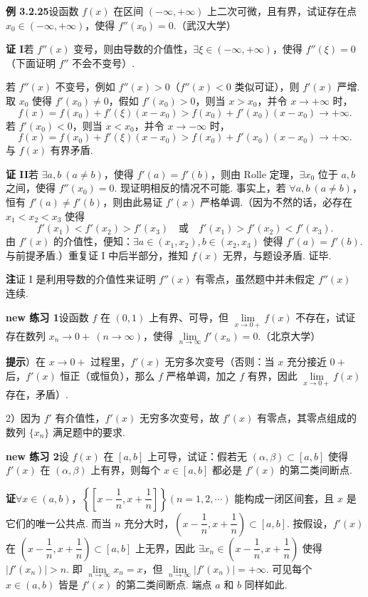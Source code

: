 \documentclass[UTF8,12pt,a4paper,fontset=fandol]{ctexart}
\begin{document}
\noindent\textbf{例 3.2.25}\quad 设函数 $f(x)$ 在区间 $(-\infty,+\infty)$ 上二次可微，且有界，试证存在点 $x_0\in(-\infty,+\infty)$，使得 $f''(x_0)=0$.（武汉大学）

\noindent\textbf{证 I}\quad 若 $f''(x)$ 变号，则由导数的介值性，$\exists\xi\in(-\infty,+\infty)$，使得 $f''(\xi)=0$（下面证明 $f''$ 不会不变号）.

若 $f''(x)$ 不变号，例如 $f''(x)>0$（$f''(x)<0$ 类似可证），则 $f'(x)$ 严增. 取 $x_0$ 使得 $f'(x_0)\ne0$，假如 $f'(x_0)>0$，则当 $x>x_0$，并令 $x\to+\infty$ 时，
\[
  f(x)=f(x_0)+f'(\xi)(x-x_0)>f(x_0)+f'(x_0)(x-x_0)\to+\infty.
\]
若 $f'(x_0)<0$，则当 $x<x_0$，并令 $x\to-\infty$ 时，
\[
  f(x)=f(x_0)+f'(\xi)(x-x_0)>f(x_0)+f'(x_0)(x-x_0)\to+\infty.
\]
与 $f(x)$ 有界矛盾.

\noindent\textbf{证 II}\quad 若 $\exists a,b\ (a\ne b)$，使得 $f'(a)=f'(b)$，则由 Rolle 定理，$\exists x_0$ 位于 $a,b$ 之间，使得 $f''(x_0)=0$. 现证明相反的情况不可能. 事实上，若 $\forall a,b\ (a\ne b)$，恒有 $f'(a)\ne f'(b)$，则由此易证 $f'(x)$ 严格单调.（因为不然的话，必存在 $x_1<x_2<x_3$ 使得
\[
  f'(x_1)<f'(x_2)>f'(x_3)\quad\text{或}\quad f'(x_1)>f'(x_2)<f'(x_3).
\]
由 $f'(x)$ 的介值性，便知：$\exists a\in(x_1,x_2),b\in(x_2,x_3)$ 使得 $f'(a)=f'(b)$. 与前提矛盾.）重复证 I 中后半部分，推知 $f(x)$ 无界，与题设矛盾. 证毕.

\noindent\textbf{注}\quad 证 I 是利用导数的介值性来证明 $f''(x)$ 有零点，虽然题中并未假定 $f''(x)$ 连续.

\noindent\textbf{new 练习 1}\quad 设函数 $f$ 在 $(0,1)$ 上有界、可导，但 $\lim\limits_{x\to0+}f(x)$ 不存在，试证存在数列 $x_n\to0+\ (n\to\infty)$，使得 $\lim\limits_{n\to\infty}f'(x_n)=0$.（北京大学）

\noindent\textbf{提示}）在 $x\to0+$ 过程里，$f'(x)$ 无穷多次变号（否则：当 $x$ 充分接近 $0+$ 后，$f'(x)$ 恒正（或恒负），那么 $f$ 严格单调，加之 $f$ 有界，因此 $\lim\limits_{x\to0+}f(x)$ 存在，矛盾）.

2）因为 $f'$ 有介值性，$f'(x)$ 无穷多次变号，故 $f'(x)$ 有零点，其零点组成的数列 $\{x_n\}$ 满足题中的要求.

\noindent\textbf{new 练习 2}\quad 设 $f(x)$ 在 $[a,b]$ 上可导，试证：假若无 $(\alpha,\beta)\subset[a,b]$ 使得 $f'(x)$ 在 $(\alpha,\beta)$ 上有界，则每个 $x\in[a,b]$ 都必是 $f'(x)$ 的第二类间断点.

\noindent\textbf{证}\quad $\forall x\in(a,b)$，$\left\{\left[x-\dfrac1n,x+\dfrac1n\right]\right\}(n=1,2,\cdots)$ 能构成一闭区间套，且 $x$ 是它们的唯一公共点. 而当 $n$ 充分大时，$\left(x-\dfrac1n,x+\dfrac1n\right)\subset[a,b]$. 按假设，$f'(x)$ 在 $\left(x-\dfrac1n,x+\dfrac1n\right)\subset[a,b]$ 上无界，因此 $\exists x_n\in\left(x-\dfrac1n,x+\dfrac1n\right)$ 使得 $|f'(x_n)|>n$. 即 $\lim\limits_{n\to\infty}x_n=x$，但 $\lim\limits_{n\to\infty}|f'(x_n)|=+\infty$. 可见每个 $x\in(a,b)$ 皆是 $f'(x)$ 的第二类间断点. 端点 $a$ 和 $b$ 同样如此.
\end{document}
